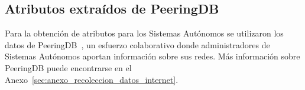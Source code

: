 

    





    



\subsection{Atributos extraídos de PeeringDB} \label{sec:Atributos_extraidos_PeeringDB}

Para la obtención de atributos para los Sistemas Autónomos se utilizaron los datos de PeeringDB~\cite{PeeringDB}, un esfuerzo colaborativo donde administradores de Sistemas Autónomos aportan información sobre sus redes. Más información sobre PeeringDB puede encontrarse en el Anexo~\ref{sec:anexo_recoleccion_datos_internet}.\\


